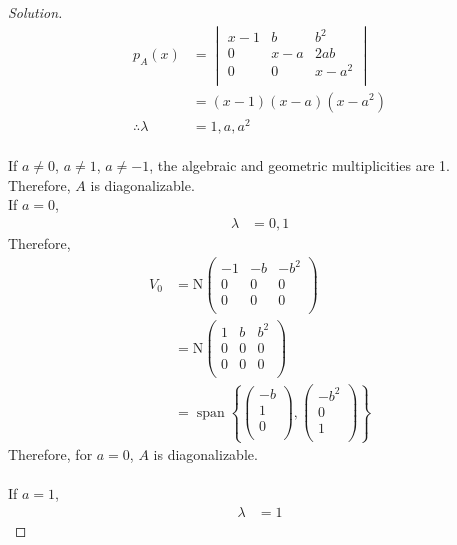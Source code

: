 \documentclass[fleqn, a4paper, 12pt]{article}
\DeclareMathOperator{\vspan}{\mathrm{span}} %
\theoremstyle{definition}
\theoremstyle{theorem}
\theoremstyle{remark}
\newcommand{\N}{\mathrm{N}}
\newenvironment{solution} %
	{\begin{proof}[Solution]\let\qed\relax}
	{\end{proof}}
\numberwithin{corollary}{theorem}
\numberwithin{equation}{theorem}
\begin{document}
\begin{solution}
	\begin{align*}
		p_A(x) &= 
			\begin{vmatrix}
				x - 1 & b & b^2\\
				0 & x - a & 2ab\\
				0 & 0 & x - a^2\\
			\end{vmatrix}\\
		&= (x - 1) (x - a) (x - a^2)\\
		\therefore \lambda &= 1, a, a^2
	\end{align*}\\
	If $a \neq 0$, $a \neq 1$, $a \neq -1$, the algebraic and geometric multiplicities are 1. Therefore, $A$ is diagonalizable.\\
	If $a = 0$,
	\begin{align*}
		\lambda &= 0, 1
	\end{align*}
	Therefore,
	\begin{align*}
		V_0 &= \N
			\begin{pmatrix}
				-1 & -b & -b^2\\
				0 & 0 & 0\\
				0 & 0 & 0\\
			\end{pmatrix}\\
		&= \N
			\begin{pmatrix}
				1 & b & b^2\\
				0 & 0 & 0\\
				0 & 0 & 0\\
			\end{pmatrix}\\
		&= \vspan
			\left\lbrace
				\begin{pmatrix}
					-b\\
					1\\
					0\\
				\end{pmatrix}
				,
				\begin{pmatrix}
					-b^2\\
					0\\
					1\\
				\end{pmatrix}
			\right\rbrace
	\end{align*}
	Therefore, for $a = 0$, $A$ is diagonalizable.\\
	~\\
	If $a = 1$,
	\begin{align*}
		\lambda &= 1
	\end{align*}

\end{solution}
\end{document}
